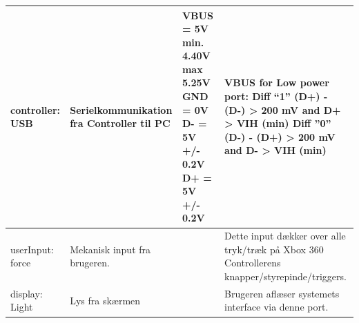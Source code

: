 \begin{table}[h]
\begin{tabularx}{\textwidth}{|l|X|X|X|}
controller: USB
	& Serielkommunikation fra Controller til PC 
	& VBUS = 5V min. 4.40V max 5.25V \newline
		GND = 0V \newline
		D- = 5V +/- 0.2V \newline
		D+ = 5V +/- 0.2V \newline
	& VBUS for Low power port: \newline
		Diff  “1” \newline
		(D+) - (D-) > 200 mV \newline
		and D+ > VIH (min) \newline
		Diff ”0” \newline
		(D-) - (D+) > 200 mV \newline
		and D- > VIH (min)
	\\ \hline
	
userInput: force
	& Mekanisk input fra brugeren.
	& 
	& Dette input dækker over alle tryk/træk på Xbox 360 Controllerens knapper/styrepinde/triggers.
	\\ \hline
	
display: Light
	& Lys fra skærmen
	& 
	& Brugeren aflæser systemets interface via denne port.
	\\ \hline
	\end{tabularx}
\end{table}